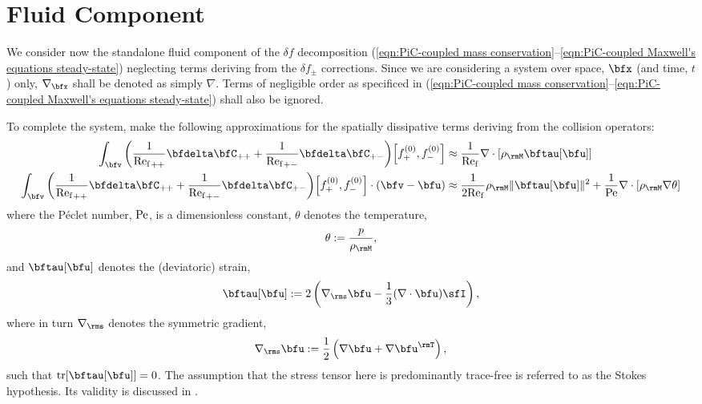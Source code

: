 \chapter{Fluid Component}    
    We consider now the standalone fluid component of the $\delta\!f$ decomposition (\ref{eqn:PiC-coupled mass conservation}--\ref{eqn:PiC-coupled Maxwell's equations steady-state}) neglecting terms deriving from the $\delta\!f_{\pm}$ corrections. Since we are considering a system over space, $\bfx$ (and time, $t$) only, $\nabla_{\bfx}$ shall be denoted as simply $\nabla$. Terms of negligible order as specificed in (\ref{eqn:PiC-coupled mass conservation}--\ref{eqn:PiC-coupled Maxwell's equations steady-state}) shall also be ignored.
    
    To complete the system, make the following approximations for the spatially dissipative terms deriving from the collision operators:
    \begin{align}
        \int_{\bfv}\left(\frac{1}{{\rmRef}_{++}}\bfdelta\bfC_{++} + \frac{1}{{\rmRef}_{+-}}\bfdelta\bfC_{+-}\right)\!\left[f_{+}^{(0)}, f_{-}^{(0)}\right]                    &\approx  \frac{1}{\rmRef}\nabla\cdot[\rho_{\rmM}\bftau[\bfu]]  \\
        \int_{\bfv}\left(\frac{1}{{\rmRef}_{++}}\bfdelta\bfC_{++} + \frac{1}{{\rmRef}_{+-}}\bfdelta\bfC_{+-}\right)\!\left[f_{+}^{(0)}, f_{-}^{(0)}\right]\cdot(\bfv - \bfu)  &\approx  \frac{1}{2\rmRef}\rho_{\rmM}\|\bftau[\bfu]\|^{2} + \frac{1}{\rmPe}\nabla\cdot[\rho_{\rmM}\nabla\theta]
    \end{align}
    where the Péclet number, $\mathrm{Pe}$, is a dimensionless constant, $\theta$ denotes the temperature,
    \begin{equation}
        \theta  :=  \frac{p}{\rho_{\rmM}},
    \end{equation}
    and $\bftau[\bfu]$ denotes the (deviatoric) strain,
    \begin{equation}\label{eqn:strain equation}
        \bftau[\bfu]  :=  2\left(\nabla_{\rms}\bfu - \frac{1}{3}(\nabla\cdot\bfu)\sfI\right),
    \end{equation}
    where in turn $\nabla_{\rms}$ denotes the symmetric gradient,
    \begin{equation}
        \nabla_{\rms}\bfu  :=  \frac{1}{2}\left(\nabla\bfu + \nabla\bfu^{\rmT}\right),
    \end{equation}
    such that $\tr[\bftau[\bfu]]  =  0$. The assumption that the stress tensor here is predominantly trace-free is referred to as the Stokes hypothesis. \cite{Stokes_1845} Its validity is discussed in \cite{Vincenti_Kruger_1975}.

